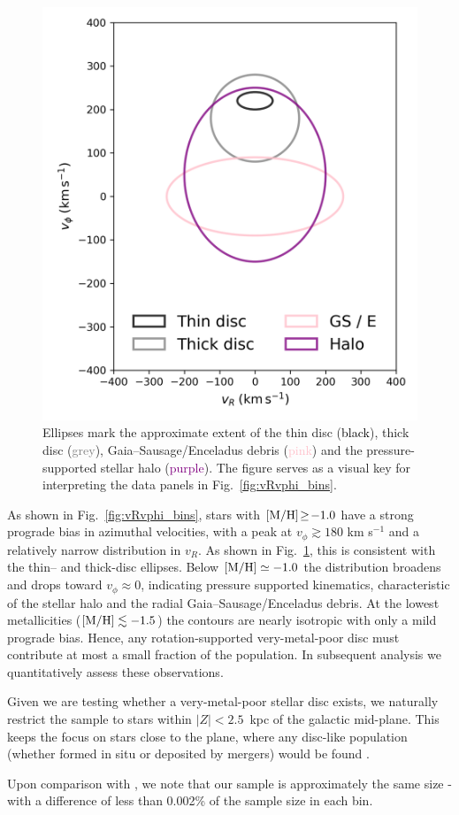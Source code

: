 \documentclass[a4paper,12pt]{article}
\begin{document}
\begin{figure}
  \centering
  \includegraphics[width=0.3\columnwidth]
                   {../figures/reference_velocity_ellipses.png}
  \caption{Ellipses mark the approximate extent of the thin disc
           (\textcolor{black}{black}), thick disc (\textcolor{gray}{grey}),
           Gaia–Sausage/Enceladus debris (\textcolor{pink}{pink}) and the
           pressure-supported stellar halo (\textcolor{purple}{purple}).
           The figure serves as a visual key for interpreting the data panels
           in Fig.~\ref{fig:vRvphi_bins}.
           }
  \label{fig:ref_ellipses}
\end{figure}

As shown in Fig.~\ref{fig:vRvphi_bins}, stars with
${\rm[M/H]}\!\geq\!-1.0$ have a strong prograde bias in azimuthal velocities, 
with a peak at $v_\phi\!\gtrsim\!180$ km s$^{-1}$ and a relatively narrow
distribution in $v_R$. As shown in Fig.~\ref{fig:ref_ellipses}, this is consistent with 
the thin– and thick-disc ellipses. 
Below ${\rm[M/H]}\simeq-1.0$ the distribution broadens and
drops toward $v_\phi\!\approx\!0$, indicating
pressure supported kinematics, characteristic of the stellar halo and
the radial Gaia–Sausage/Enceladus debris.  At the lowest
metallicities (${\rm[M/H]}\lesssim-1.5$) the contours are nearly
isotropic with only a mild prograde bias.  Hence, any
rotation-supported very-metal-poor disc must contribute at most a
small fraction of the population. In subsequent analysis we quantitatively assess
these observations.

Given we are testing whether a very-metal-poor stellar disc exists, we naturally 
restrict the sample to stars within \mbox{$|Z|<2.5$ kpc} of the galactic mid-plane. 
This keeps the focus on stars close to the plane, where any disc-like population 
(whether formed in situ or deposited by mergers) would be found \citep{Tkachenko_2025}.

Upon comparison with \citet{zhang2024existencemetalpoordiscmilky}, we note that our 
sample is approximately the same size - with a difference of less than 0.002\% of the sample size in each bin.
\end{document}
